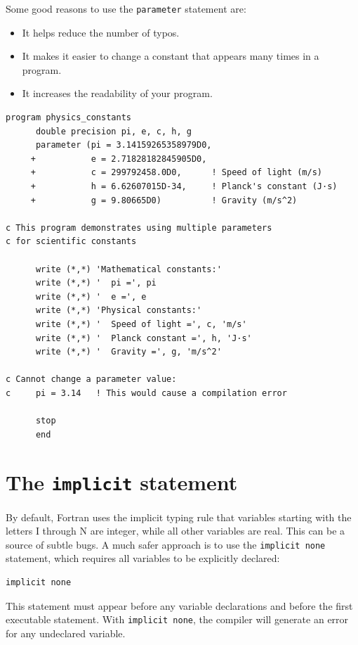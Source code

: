 Some good reasons to use the \texttt{parameter} statement are:

\begin{itemize}
    \item It helps reduce the number of typos.
    \item It makes it easier to change a constant that appears many times in a program.
    \item It increases the readability of your program.
\end{itemize}

\begin{lstlisting}[style=fortran77]
      program physics_constants
      double precision pi, e, c, h, g
      parameter (pi = 3.14159265358979D0,
     +           e = 2.71828182845905D0,
     +           c = 299792458.0D0,      ! Speed of light (m/s)
     +           h = 6.62607015D-34,     ! Planck's constant (J·s)
     +           g = 9.80665D0)          ! Gravity (m/s^2)
      
c This program demonstrates using multiple parameters
c for scientific constants
      
      write (*,*) 'Mathematical constants:'
      write (*,*) '  pi =', pi
      write (*,*) '  e =', e
      write (*,*) 'Physical constants:'
      write (*,*) '  Speed of light =', c, 'm/s'
      write (*,*) '  Planck constant =', h, 'J·s'
      write (*,*) '  Gravity =', g, 'm/s^2'
      
c Cannot change a parameter value:
c     pi = 3.14   ! This would cause a compilation error
      
      stop
      end
\end{lstlisting}

\section{The \texttt{implicit} statement}

By default, Fortran uses the implicit typing rule that variables starting with the letters I through N are integer, while all other variables are real. This can be a source of subtle bugs. A much safer approach is to use the \texttt{implicit none} statement, which requires all variables to be explicitly declared:

\begin{lstlisting}[style=fortran77]
      implicit none
\end{lstlisting}

This statement must appear before any variable declarations and before the first executable statement. With \texttt{implicit none}, the compiler will generate an error for any undeclared variable.

